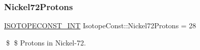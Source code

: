 \subsubsection{\texorpdfstring{Nickel72\+Protons}{Nickel72Protons}}
{\footnotesize\ttfamily \mbox{\hyperlink{group___isotope_const-_macros_ga5f18360b3e99483a35c32d789e62621c}{I\+S\+O\+T\+O\+P\+E\+C\+O\+N\+S\+T\+\_\+\+I\+NT}} Isotope\+Const\+::\+Nickel72\+Protons = 28}

\$ \$ Protons in Nickel-\/72. 